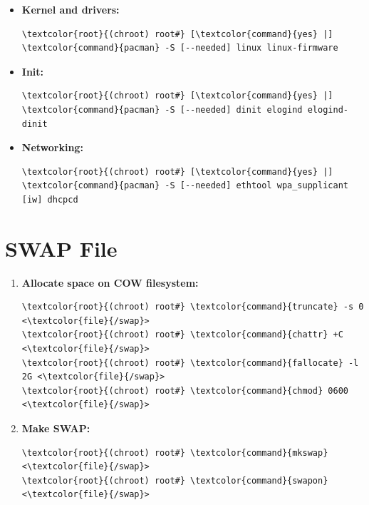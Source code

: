 \documentclass[10pt, a4paper, onecolumn, oneside, titlepage, openany]{book}
\begin{document}
\begin{itemize}
\begin{Verbatim}[commandchars=\\\{\}]
\textcolor{root}{(chroot) root#} [\textcolor{command}{yes} |] \textcolor{command}{pacman} -S [--needed] intel-ucode
\end{Verbatim}
    \item \textbf{Kernel and drivers:}
\begin{Verbatim}[commandchars=\\\{\}]
\textcolor{root}{(chroot) root#} [\textcolor{command}{yes} |] \textcolor{command}{pacman} -S [--needed] linux linux-firmware
\end{Verbatim}
    \item \textbf{Init:}
\begin{Verbatim}[commandchars=\\\{\}]
\textcolor{root}{(chroot) root#} [\textcolor{command}{yes} |] \textcolor{command}{pacman} -S [--needed] dinit elogind elogind-dinit
\end{Verbatim}
    \item \textbf{Networking:}
\begin{Verbatim}[commandchars=\\\{\}]
\textcolor{root}{(chroot) root#} [\textcolor{command}{yes} |] \textcolor{command}{pacman} -S [--needed] ethtool wpa_supplicant
[iw] dhcpcd
\end{Verbatim}
\end{itemize}

\section{SWAP File}
\begin{enumerate}
    \item \textbf{Allocate space on COW filesystem:}
\begin{Verbatim}[commandchars=\\\{\}]
\textcolor{root}{(chroot) root#} \textcolor{command}{truncate} -s 0 <\textcolor{file}{/swap}>
\textcolor{root}{(chroot) root#} \textcolor{command}{chattr} +C <\textcolor{file}{/swap}>
\textcolor{root}{(chroot) root#} \textcolor{command}{fallocate} -l 2G <\textcolor{file}{/swap}>
\textcolor{root}{(chroot) root#} \textcolor{command}{chmod} 0600 <\textcolor{file}{/swap}>
\end{Verbatim}
    \item \textbf{Make SWAP:}
\begin{Verbatim}[commandchars=\\\{\}]
\textcolor{root}{(chroot) root#} \textcolor{command}{mkswap} <\textcolor{file}{/swap}>
\textcolor{root}{(chroot) root#} \textcolor{command}{swapon} <\textcolor{file}{/swap}>
\end{Verbatim}
\end{enumerate}
\end{document}
